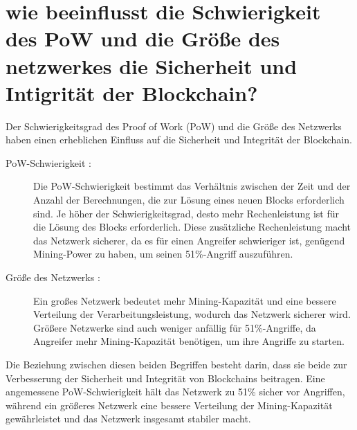 \documentclass[ngerman]{scrreprt}
\begin{document}
\section{wie beeinflusst die Schwierigkeit des PoW und die Größe des netzwerkes die Sicherheit und Intigrität der Blockchain?}
Der Schwierigkeitsgrad des Proof of Work (PoW) und die Größe des Netzwerks haben einen erheblichen Einfluss auf die Sicherheit und Integrität der Blockchain.
\begin{description}
	\item[PoW-Schwierigkeit : ] Die PoW-Schwierigkeit bestimmt das Verhältnis zwischen der Zeit und der Anzahl der Berechnungen, die zur Lösung eines neuen Blocks erforderlich sind. Je höher der Schwierigkeitsgrad, desto mehr Rechenleistung ist für die Lösung des Blocks erforderlich. Diese zusätzliche Rechenleistung macht das Netzwerk sicherer, da es für einen Angreifer schwieriger ist, genügend Mining-Power zu haben, um seinen 51\%-Angriff auszuführen.
	\item[Größe des Netzwerks : ] Ein großes Netzwerk bedeutet mehr Mining-Kapazität und eine bessere Verteilung der Verarbeitungsleistung, wodurch das Netzwerk sicherer wird. Größere Netzwerke sind auch weniger anfällig für 51\%-Angriffe, da Angreifer mehr Mining-Kapazität benötigen, um ihre Angriffe zu starten.
\end{description}
Die Beziehung zwischen diesen beiden Begriffen besteht darin, dass sie beide zur Verbesserung der Sicherheit und Integrität von Blockchains beitragen. Eine angemessene PoW-Schwierigkeit hält das Netzwerk zu 51\% sicher vor Angriffen, während ein größeres Netzwerk eine bessere Verteilung der Mining-Kapazität gewährleistet und das Netzwerk insgesamt stabiler macht. 


\end{document}
